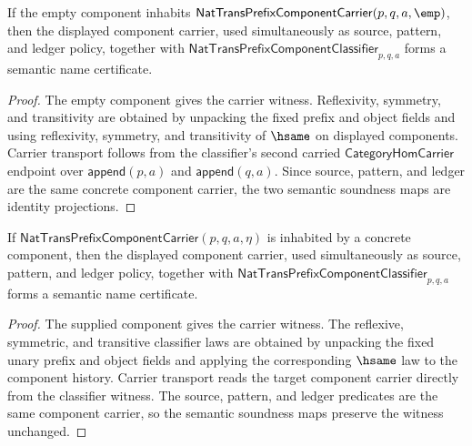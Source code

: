 \begin{theorem}
\label{thm:nattrans-prefix-component-classifier-semantic-namecert}
If the empty component inhabits
$\mathsf{NatTransPrefixComponentCarrier}(p,q,a,\emp)$, then the displayed
component carrier, used simultaneously as source, pattern, and ledger policy,
together with
$\mathsf{NatTransPrefixComponentClassifier}_{p,q,a}$ forms a semantic name
certificate.
\end{theorem}
\begin{proof}
The empty component gives the carrier witness. Reflexivity, symmetry, and
transitivity are obtained by unpacking the fixed prefix and object fields and
using reflexivity, symmetry, and transitivity of $\hsame$ on displayed
components. Carrier transport follows from the classifier's second carried
$\mathsf{CategoryHomCarrier}$ endpoint over
$\mathsf{append}(p,a)$ and $\mathsf{append}(q,a)$. Since source, pattern, and
ledger are the same concrete component carrier, the two semantic soundness maps
are identity projections.
\end{proof}

\begin{theorem}
\label{thm:nattrans-prefix-component-classifier-component-semantic-namecert}
If $\mathsf{NatTransPrefixComponentCarrier}(p,q,a,\eta)$ is inhabited by a
concrete component, then the displayed component carrier, used simultaneously
as source, pattern, and ledger policy, together with
$\mathsf{NatTransPrefixComponentClassifier}_{p,q,a}$ forms a semantic name
certificate.
\end{theorem}
\begin{proof}
The supplied component gives the carrier witness. The reflexive, symmetric,
and transitive classifier laws are obtained by unpacking the fixed unary prefix
and object fields and applying the corresponding $\hsame$ law to the component
history. Carrier transport reads the target component carrier directly from
the classifier witness. The source, pattern, and ledger predicates are the
same component carrier, so the semantic soundness maps preserve the witness
unchanged.
\end{proof}

